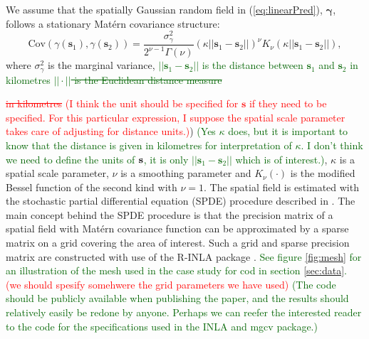 \documentclass[a4paper 12pt]{article}
\numberwithin{equation}{section}
\newcommand{\ed}[1]{\textcolor{red}{#1}}
\newcommand{\olav}[1]{\textcolor{darkgreen}{#1}}
\begin{document}
We assume that the spatially Gaussian random field in (\ref{eq:linearPred}), $\pmb{\gamma}$, follows a stationary Mat\'{e}rn covariance structure:
\begin{equation}\label{eq:matern}
 \text{Cov}(\gamma(\mathbf{s}_1),\gamma(\mathbf{s}_2)) = \frac{\sigma^2_{\gamma}}{2^{\nu-1}\Gamma(\nu)}(\kappa||\mathbf{s}_1 -\mathbf{s}_2||)^{\nu}K_{\nu}(\kappa||\mathbf{s}_1-\mathbf{s}_2||),
\end{equation}
where $\sigma^2_{\gamma}$ is the marginal variance, \olav{$||\mathbf{s}_1-\mathbf{s}_2||$ is the distance between $\mathbf{s}_1$ and $\mathbf{s}_2$ in kilometres} \olav{\sout{$||\cdot||$ is the Euclidean distance measure}} {\ed{\sout{in kilometres} (I think the unit should be specified for $\mathbf{s}$ if they need to be specified. For this particular expression, I suppose the spatial scale parameter takes care of adjusting for distance units.)}) \olav{(Yes $\kappa$ does, but it is important to know that the distance is given in kilometres for interpretation of $\kappa$. I don't think we need to define the units of ${\bf s}$, it is only $||\mathbf{s}_1-\mathbf{s}_2||$ which is of interest.)}, $\kappa$ is a spatial scale parameter, $\nu$ is a smoothing parameter and $K_{\nu}(\cdot)$ is the modified Bessel function of the second kind with $\nu = 1$.  The spatial field is estimated with the stochastic partial differential equation (SPDE) procedure described in \citet{lindgren2011explicit}. The main concept behind the SPDE procedure is that the precision matrix of a spatial field with Mat\'{e}rn  covariance function can be approximated by a sparse matrix on a grid covering the area of interest. Such a grid and sparse precision matrix are constructed with use of the R-INLA package \citep{rue2009approximate}. \olav{See figure \ref{fig:mesh} for an illustration of the mesh used in the case study for cod in section \ref{sec:data}.} \ed{(we should spesify somehwere the grid parameters we have used)} \olav{(The code should be publicly available when publishing the paper, and the results should relatively easily be redone by anyone. Perhaps we can reefer the interested reader to the code for the specifications used in the INLA and mgcv package.)}


}
\end{document}
